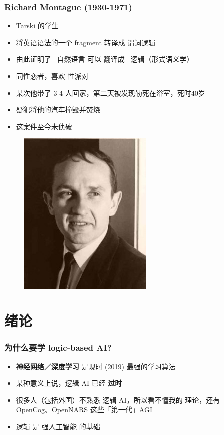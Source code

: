 \documentclass[17pt]{beamer}
\begin{document}
\begin{frame}
\frametitle{Richard Montague (1930-1971)}
\fontsize{14}{14}\selectfont
\begin{minipage}[t]{0.62\linewidth}
	\begin{itemize}
		\item Tarski 的学生
		\item 将英语语法的一个 fragment 转译成 谓词逻辑
		\item 由此证明了 {\color{red}\ 自然语言} 可以 翻译成 {\color{red}\ 逻辑}（形式语义学）
		\item 同性恋者，喜欢 性派对
		\item 某次他带了 3-4 人回家，第二天被发现勒死在浴室，死时40岁
		\item 疑犯将他的汽车撞毁并焚烧
		\item 这案件至今未侦破
	\end{itemize}
\end{minipage}
\hfill
\begin{minipage}[t]{0.35\linewidth}
	\begin{figure}[H]
		\includegraphics[scale=0.5]{Montague.jpg}
	\end{figure}
\end{minipage}
\end{frame}

\section[Section]{绪论}
\frame{\sectionpage}

\begin{frame}
\frametitle{为什么要学 logic-based AI?}
\begin{itemize}
	\item \textbf{神经网络／深度学习} 是现时 (2019) 最强的学习算法
	\item 某种意义上说，逻辑 AI 已经 \textbf{过时}
	\item 很多人（包括外国）不熟悉 逻辑 AI，所以看不懂我的 理论，还有 OpenCog、OpenNARS 这些「第一代」AGI
	\item 逻辑 是 强人工智能 的基础
\end{itemize}
\end{frame}
\end{document}

